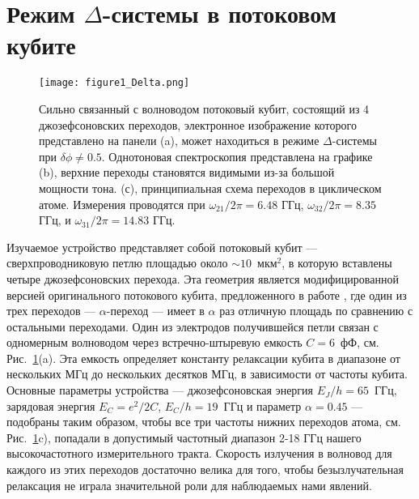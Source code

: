 \section{Режим $\Delta$-системы в потоковом кубите}
\begin{figure}
	\centering
	\texttt{[image: figure1\_Delta.png]}
	\caption[Потоковый кубит в режиме $\Delta$-системы]{Сильно связанный с волноводом потоковый кубит, состоящий из 4 джозефсоновских переходов, электронное изображение которого представлено на панели (a), может находиться в режиме $\Delta$-системы при $\delta\phi \ne 0.5$. Однотоновая спектроскопия представлена на графике (b), верхние переходы становятся видимыми из-за большой мощности тона. (с), принципиальная схема переходов в циклическом атоме. Измерения проводятся при $\omega_{21}/2\pi = 6.48$ ГГц, $\omega_{32}/2\pi = 8.35$ ГГц, и $\omega_{31}/2\pi = 14.83$ ГГц.}
	\label{fig: flux_delta}
\end{figure}
Изучаемое устройство представляет собой потоковый кубит --- сверхпроводниковую петлю площадью около $\sim 10$~мкм$^{2}$, в которую вставлены четыре джозефсоновских перехода. Эта геометрия является модифицированной версией оригинального потокового кубита, предложенного в работе \cite{mooij1999josephson}, где один из трех переходов --- $\alpha$-переход --- имеет в $\alpha$ раз отличную площадь по сравнению с остальными переходами. Один из электродов получившейся петли связан с одномерным волноводом через встречно-штыревую емкость $C=6$~фФ, см. Рис.~\ref{fig: flux_delta}(a). Эта емкость определяет константу релаксации кубита в диапазоне от нескольких МГц до нескольких десятков МГц, в зависимости от частоты кубита. Основные параметры устройства --- джозефсоновская энергия $E_{J}/h=65$~ГГц, зарядовая энергия $E_{C}=e^2/2C$, $E_{C}/h=19$~ГГц и параметр $\alpha=0.45$ --- подобраны таким образом, чтобы все три частоты нижних переходов атома, см. Рис.~\ref{fig: flux_delta}c), попадали в допустимый частотный диапазон 2-18 ГГц нашего высокочастотного измерительного тракта. Скорость излучения в волновод для каждого из этих переходов достаточно велика для того, чтобы безызлучательная релаксация не играла значительной роли для наблюдаемых нами явлений. 

